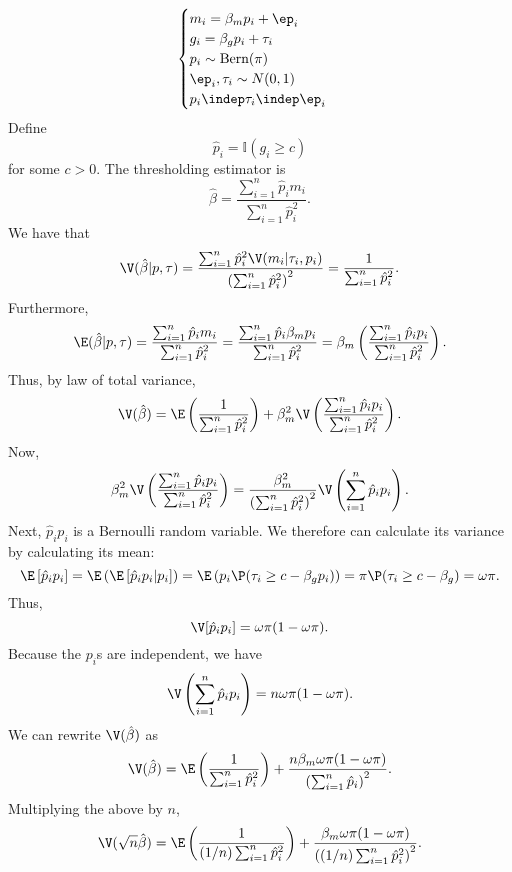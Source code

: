 \documentclass[12pt]{article}
\begin{document}
$$
\begin{cases}
m_i = \beta_m p_i + \ep_i \\
g_i = \beta_g p_i + \tau_i \\
p_i \sim \textrm{Bern}(\pi) \\
\ep_i, \tau_i \sim N(0,1) \\
p_i \indep \tau_i \indep \ep_i
\end{cases}
$$
Define $$\hat{p}_i = \mathbb{I}\left( g_i \geq c \right)$$ for some $c > 0$. The thresholding estimator is
$$\hat{\beta} = \frac{\sum_{i=1}^n \hat{p}_i m_i}{\sum_{i=1}^n \hat{p}_i^2}.$$
We have that
$$ \V(\hat{\beta}| p, \tau ) = \frac{ \sum_{i=1}^n \hat{p}_i^2 \V(m_i | \tau_i, p_i)}{ \left( \sum_{i=1}^n \hat{p}^2_i \right)^2 } = \frac{1}{\sum_{i=1}^n \hat{p}_i^2}.$$ Furthermore,
$$\E(\hat{\beta} | p, \tau)  = \frac{ \sum_{i=1}^n \hat{p}_i m_i}{ \sum_{i=1}^n \hat{p}^2_i} = \frac{\sum_{i=1}^n \hat{p}_i \beta_m p_i }{\sum_{i=1}^n \hat{p}_i^2} = \beta_m \left( \frac{\sum_{i=1}^n \hat{p}_i p_i}{\sum_{i=1}^n \hat{p}_i^2} \right) .$$ Thus, by law of total variance,
$$ \V(\hat{\beta}) = \E \left(\frac{ 1 }{ \sum_{i=1}^n \hat{p}_i^2}\right) + \beta_m^2 \V\left(\frac{\sum_{i=1}^n \hat{p}_i p_i}{\sum_{i=1}^n \hat{p}_i^2} \right).$$
Now,
$$\beta_m^2 \V\left(\frac{\sum_{i=1}^n \hat{p}_i p_i}{\sum_{i=1}^n \hat{p}_i^2}\right) = \frac{\beta_m^2}{ \left(\sum_{i=1}^n \hat{p}_i^2 \right)^2 } \V \left( \sum_{i=1}^n \hat{p}_i p_i \right).$$
Next, $\hat{p}_i p_i$ is a Bernoulli random variable. We therefore can calculate its variance by calculating its mean:
$$
\E\left[ \hat{p}_i p_i \right]  = \E\left( \E\left[ \hat{p}_i p_i | p_i \right]\right) = \E \left( p_i \P( \tau_i \geq c - \beta_g p_i ) \right) = \pi\P( \tau_i \geq c - \beta_g) = \omega \pi.
$$
Thus, $$\V[\hat{p}_ip_i] = \omega \pi (1 - \omega \pi).$$ Because the $p_i$s are independent, we have
$$ \V \left( \sum_{i=1}^n \hat{p}_i p_i \right) = n \omega \pi (1 - \omega \pi).$$
We can rewrite $\V(\hat{\beta})$ as 
$$ \V(\hat{\beta}) = \E \left( \frac{1}{\sum_{i=1}^n \hat{p}_i^2} \right) + \frac{n \beta_m \omega \pi (1 - \omega \pi)}{ \left(\sum_{i=1}^n \hat{p}_i \right)^2}.$$ Multiplying the above by $n$,
$$ \V(\sqrt{n} \hat{\beta}) = \E \left( \frac{1}{ (1/n) \sum_{i=1}^n \hat{p}_i^2 } \right) + \frac{ \beta_m \omega \pi (1 - \omega \pi) }{ \left( (1/n) \sum_{i=1}^n \hat{p}_i^2 \right)^2}.$$
\end{document}
